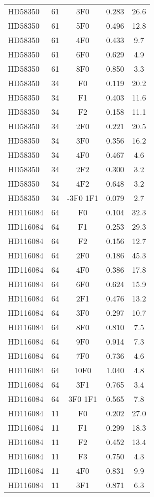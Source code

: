 \begin{table*}
\begin{tabular}{l c c c c}
HD58350 & 61 & 3F0 & 0.283 & 26.6\\ 
HD58350 & 61 & 5F0 & 0.496 & 12.8\\ 
HD58350 & 61 & 4F0 & 0.433 & 9.7\\ 
HD58350 & 61 & 6F0 & 0.629 & 4.9\\ 
HD58350 & 61 & 8F0 & 0.850 & 3.3\\ 
\hline
HD58350 & 34 & F0 & 0.119 & 20.2\\ 
HD58350 & 34 & F1 & 0.403 & 11.6\\ 
HD58350 & 34 & F2 & 0.158 & 11.1\\ 
HD58350 & 34 & 2F0 & 0.221 & 20.5\\ 
HD58350 & 34 & 3F0 & 0.356 & 16.2\\ 
HD58350 & 34 & 4F0 & 0.467 & 4.6\\ 
HD58350 & 34 & 2F2 & 0.300 & 3.2\\ 
HD58350 & 34 & 4F2 & 0.648 & 3.2\\ 
HD58350 & 34 & -3F0 1F1 & 0.079 & 2.7\\ 
\hline
HD116084 & 64 & F0 & 0.104 & 32.3\\ 
HD116084 & 64 & F1 & 0.253 & 29.3\\ 
HD116084 & 64 & F2 & 0.156 & 12.7\\ 
HD116084 & 64 & 2F0 & 0.186 & 45.3\\ 
HD116084 & 64 & 4F0 & 0.386 & 17.8\\ 
HD116084 & 64 & 6F0 & 0.624 & 15.9\\ 
HD116084 & 64 & 2F1 & 0.476 & 13.2\\ 
HD116084 & 64 & 3F0 & 0.297 & 10.7\\ 
HD116084 & 64 & 8F0 & 0.810 & 7.5\\ 
HD116084 & 64 & 9F0 & 0.914 & 7.3\\ 
HD116084 & 64 & 7F0 & 0.736 & 4.6\\ 
HD116084 & 64 & 10F0 & 1.040 & 4.8\\ 
HD116084 & 64 & 3F1 & 0.765 & 3.4\\ 
HD116084 & 64 & 3F0 1F1 & 0.565 & 7.8\\ 
\hline
HD116084 & 11 & F0 & 0.202 & 27.0\\ 
HD116084 & 11 & F1 & 0.299 & 18.3\\ 
HD116084 & 11 & F2 & 0.452 & 13.4\\ 
HD116084 & 11 & F3 & 0.750 & 4.3\\ 
HD116084 & 11 & 4F0 & 0.831 & 9.9\\ 
HD116084 & 11 & 3F1 & 0.871 & 6.3\\ 

\end{tabular}
\end{table*}
